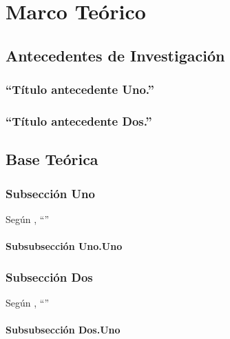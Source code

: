 \chapter{Marco Teórico}
\label{teorico}

\section{Antecedentes de Investigación}

\subsection{\enquote{Título antecedente Uno.} \citet{Antec1}}

\lipsum[1-1] \citet{Antec1}

\subsection{\enquote{Título antecedente Dos.} \citet{Antec2}}

\lipsum[2-2] \citet{Antec2}

\section{Base Teórica}

\subsection{Subsección Uno}
Según \citet{Antec1}, \enquote{\lipsum[1-1]}

\subsubsection{Subsubsección Uno.Uno}
\lipsum[1-2]

\subsection{Subsección Dos}
Según \citet{Antec1}, \enquote{\lipsum[3-3]}

\subsubsection{Subsubsección Dos.Uno}
\lipsum[5-6]